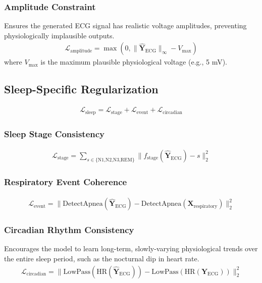 \documentclass[11pt,en]{elegantpaper}
\begin{document}
\subsubsection{Amplitude Constraint}
Ensures the generated ECG signal has realistic voltage amplitudes, preventing physiologically implausible outputs.
\begin{align}
\mathcal{L}_{\text{amplitude}} = \max(0, \|\hat{\mathbf{Y}}_{\text{ECG}}\|_{\infty} - V_{\max})
\end{align}
where $V_{\max}$ is the maximum plausible physiological voltage (e.g., 5 mV).

\subsection{Sleep-Specific Regularization}

\begin{align}
\mathcal{L}_{\text{sleep}} = \mathcal{L}_{\text{stage}} + \mathcal{L}_{\text{event}} + \mathcal{L}_{\text{circadian}}
\end{align}

\subsubsection{Sleep Stage Consistency}
\begin{align}
\mathcal{L}_{\text{stage}} = \sum_{s \in \{\text{N1,N2,N3,REM}\}} \|f_{\text{stage}}(\hat{\mathbf{Y}}_{\text{ECG}}) - s\|_2^2
\end{align}

\subsubsection{Respiratory Event Coherence}
\begin{align}
\mathcal{L}_{\text{event}} = \|\text{DetectApnea}(\hat{\mathbf{Y}}_{\text{ECG}}) - \text{DetectApnea}(\mathbf{X}_{\text{respiratory}})\|_2^2
\end{align}

\subsubsection{Circadian Rhythm Consistency}
Encourages the model to learn long-term, slowly-varying physiological trends over the entire sleep period, such as the nocturnal dip in heart rate.
\begin{align}
\mathcal{L}_{\text{circadian}} = \|\text{LowPass}(\text{HR}(\hat{\mathbf{Y}}_{\text{ECG}})) - \text{LowPass}(\text{HR}(\mathbf{Y}_{\text{ECG}}))\|_2^2
\end{align}
\end{document}
